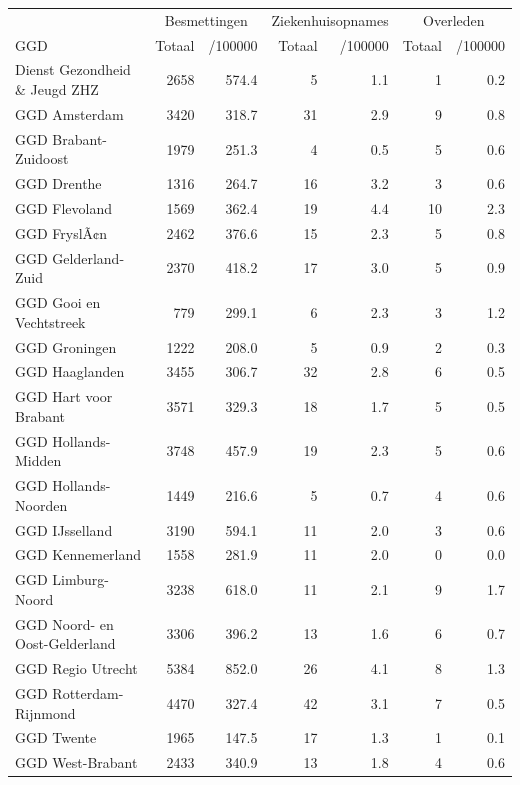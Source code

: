 \documentclass[
  english,
  man,floatsintext]{apa6}
\begin{document}
\begin{table}
\centering\begingroup\fontsize{10}{12}\selectfont

\begin{threeparttable}
\begin{tabular}{lrrrrrr}
\toprule
\multicolumn{1}{c}{ } & \multicolumn{2}{c}{Besmettingen} & \multicolumn{2}{c}{Ziekenhuisopnames} & \multicolumn{2}{c}{Overleden} \\
\cmidrule(l{3pt}r{3pt}){2-3} \cmidrule(l{3pt}r{3pt}){4-5} \cmidrule(l{3pt}r{3pt}){6-7}
GGD & Totaal & /100000 & Totaal & /100000 & Totaal & /100000\\
\midrule
Dienst Gezondheid \& Jeugd ZHZ & 2658 & 574.4 & 5 & 1.1 & 1 & 0.2\\
GGD Amsterdam & 3420 & 318.7 & 31 & 2.9 & 9 & 0.8\\
GGD Brabant-Zuidoost & 1979 & 251.3 & 4 & 0.5 & 5 & 0.6\\
GGD Drenthe & 1316 & 264.7 & 16 & 3.2 & 3 & 0.6\\
GGD Flevoland & 1569 & 362.4 & 19 & 4.4 & 10 & 2.3\\
GGD FryslÃ¢n & 2462 & 376.6 & 15 & 2.3 & 5 & 0.8\\
GGD Gelderland-Zuid & 2370 & 418.2 & 17 & 3.0 & 5 & 0.9\\
GGD Gooi en Vechtstreek & 779 & 299.1 & 6 & 2.3 & 3 & 1.2\\
GGD Groningen & 1222 & 208.0 & 5 & 0.9 & 2 & 0.3\\
GGD Haaglanden & 3455 & 306.7 & 32 & 2.8 & 6 & 0.5\\
GGD Hart voor Brabant & 3571 & 329.3 & 18 & 1.7 & 5 & 0.5\\
GGD Hollands-Midden & 3748 & 457.9 & 19 & 2.3 & 5 & 0.6\\
GGD Hollands-Noorden & 1449 & 216.6 & 5 & 0.7 & 4 & 0.6\\
GGD IJsselland & 3190 & 594.1 & 11 & 2.0 & 3 & 0.6\\
GGD Kennemerland & 1558 & 281.9 & 11 & 2.0 & 0 & 0.0\\
GGD Limburg-Noord & 3238 & 618.0 & 11 & 2.1 & 9 & 1.7\\
GGD Noord- en Oost-Gelderland & 3306 & 396.2 & 13 & 1.6 & 6 & 0.7\\
GGD Regio Utrecht & 5384 & 852.0 & 26 & 4.1 & 8 & 1.3\\
GGD Rotterdam-Rijnmond & 4470 & 327.4 & 42 & 3.1 & 7 & 0.5\\
GGD Twente & 1965 & 147.5 & 17 & 1.3 & 1 & 0.1\\
GGD West-Brabant & 2433 & 340.9 & 13 & 1.8 & 4 & 0.6\\

\end{tabular}
\end{threeparttable}
\end{table}
\end{document}
